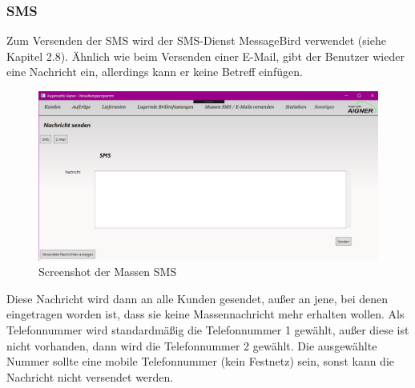 \subsubsection{SMS}
Zum Versenden der SMS wird der SMS-Dienst MessageBird verwendet (siehe Kapitel 2.8). Ähnlich wie beim Versenden einer E-Mail, gibt der Benutzer wieder eine Nachricht ein, allerdings kann er keine Betreff einfügen.
\begin{figure}[H]
\begin{center}
	\includegraphics[scale=.45]{images/Massensms.png}
\end{center}
	\caption{Screenshot der Massen SMS}
	\label{fig:sample}
\end{figure}
\noindent Diese Nachricht wird dann an alle Kunden gesendet, außer an jene, bei denen eingetragen worden ist, dass sie keine Massennachricht mehr erhalten wollen. Als Telefonnummer wird standardmäßig die Telefonnummer 1 gewählt, außer diese ist nicht vorhanden, dann wird die Telefonnummer 2 gewählt. Die ausgewählte Nummer sollte eine mobile Telefonnummer (kein Festnetz) sein, sonst kann die Nachricht nicht versendet werden.
